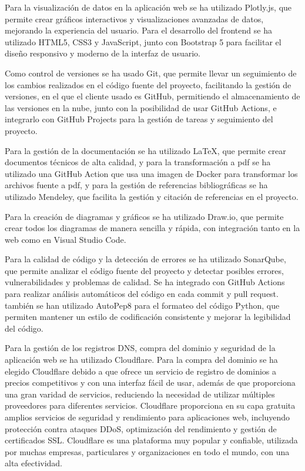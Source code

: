 Para la visualización de datos en la aplicación web se ha utilizado Plotly.js, que permite crear gráficos interactivos y visualizaciones avanzadas de datos, mejorando la experiencia del usuario. Para el desarrollo del frontend se ha utilizado HTML5, CSS3 y JavaScript, junto con Bootstrap 5 para facilitar el diseño responsivo y moderno de la interfaz de usuario.

Como control de versiones se ha usado Git, que permite llevar un seguimiento de los cambios realizados en el código fuente del proyecto, facilitando la gestión de versiones, en el que el cliente usado es GitHub, permitiendo el almacenamiento de las versiones en la nube, junto con la posibilidad de usar GitHub Actions, e integrarlo con GitHub Projects para la gestión de tareas y seguimiento del proyecto. 

Para la gestión de la documentación se ha utilizado LaTeX, que permite crear documentos técnicos de alta calidad, y para la transformación a pdf se ha utilizado una GitHub Action que usa una imagen de Docker para transformar los archivos fuente a pdf, y para la gestión de referencias bibliográficas se ha utilizado Mendeley, que facilita la gestión y citación de referencias en el proyecto.

Para la creación de diagramas y gráficos se ha utilizado Draw.io, que permite crear todos los diagramas de manera sencilla y rápida, con integración tanto en la web como en Visual Studio Code.

Para la calidad de código y la detección de errores se ha utilizado SonarQube, que permite analizar el código fuente del proyecto y detectar posibles errores, vulnerabilidades y problemas de calidad. Se ha integrado con GitHub Actions para realizar análisis automáticos del código en cada commit y pull request. también se han utilizado AutoPep8 para el formateo del código Python, que permiten mantener un estilo de codificación consistente y mejorar la legibilidad del código.

Para la gestión de los registros DNS, compra del dominio y seguridad de la aplicación web se ha utilizado Cloudflare. Para la compra del dominio se ha elegido Cloudflare debido a que ofrece un servicio de registro de dominios a precios competitivos y con una interfaz fácil de usar, además de que proporciona una gran varidad de servicios, reduciendo la necesidad de utilizar múltiples proveedores para diferentes servicios. Cloudflare proporciona en su capa gratuita amplios servicios de seguridad y rendimiento para aplicaciones web, incluyendo protección contra ataques DDoS, optimización del rendimiento y gestión de certificados SSL. Cloudflare es una plataforma muy popular y confiable, utilizada por muchas empresas, particulares y organizaciones en todo el mundo, con una alta efectividad. ~\cite{Nadeem2023,Adhar2023}


